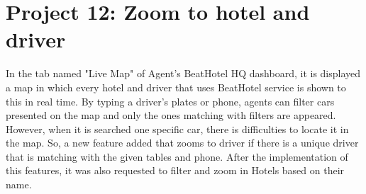 \section{Project 12: Zoom to hotel and driver}

In the tab named "Live Map" of Agent's BeatHotel HQ dashboard, it is displayed a map in which every hotel and driver that uses BeatHotel service is shown to this in real time. By typing a driver's plates or phone, agents can filter cars presented on the map and only the ones matching with filters are appeared. However, when it is searched one specific car, there is difficulties to locate it in the map. So, a new feature added that zooms to driver  if there is a unique driver that is matching with the given tables and phone. After the implementation of this features, it was also requested to filter and zoom in Hotels based on their name. \par

